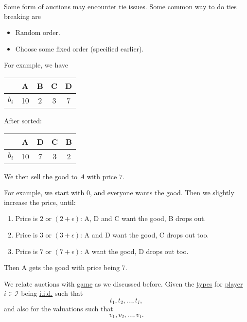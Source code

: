 \begin{note}
	Some form of auctions may encounter tie issues. Some common way to do ties breaking are
	\begin{itemize}
		\item Random order.
		\item Choose some fixed order (specified earlier).
	\end{itemize}
\end{note}

\begin{eg}
	For example, we have
	\begin{table}[H]
		\centering
		\begin{tabular}{c|c|c|c|c}
			\toprule
			          & A  & B & C & D \\
			\midrule
			\(b_{i}\) & 10 & 2 & 3 & 7 \\
			\bottomrule
		\end{tabular}
	\end{table}
	After sorted:
	\begin{table}[H]
		\centering
		\begin{tabular}{c|c|c|c|c}
			\toprule
			          & A  & D & C & B \\
			\midrule
			\(b_{i}\) & 10 & 7 & 3 & 2 \\
			\bottomrule
		\end{tabular}
	\end{table}
	We then sell the good to \(A\) with price \(7\).
\end{eg}

\begin{eg}
	For example, we start with \(0\), and everyone wants the good. Then we slightly increase the price, until:
	\begin{enumerate}
		\item Price is \(2\) or \((2+\epsilon)\):
		      A, D and C want the good, B drops out.
		\item Price is \(3\) or \((3+\epsilon)\):
		      A and D want the good, C drops out too.
		\item Price is \(7\) or \((7+\epsilon)\):
		      A want the good, D drops out too.
	\end{enumerate}
	Then A gets the good with price being \(7\).
\end{eg}

We relate auctions with \hyperref[def:mathematical-Bayesian-game]{game} as we discussed before. Given the \hyperref[def:type]{types} for \hyperref[def:player]{player}
\(i\in \mathcal{I} \) being \hyperref[def:i.i.d.]{i.i.d.} such that
\[
	t_1, t_2, \ldots , t_I,
\]
and also for the valuations such that
\[
	v_1, v_2, \ldots , v_I.
\]

